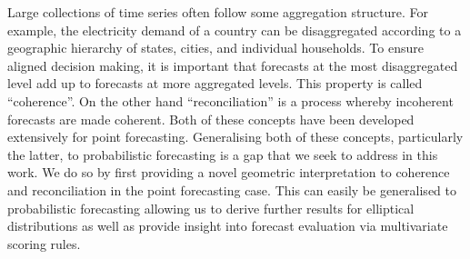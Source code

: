 \documentclass[12pt]{article}
\theoremstyle{definition}
\begin{document}

Large collections of time series often follow some aggregation structure. For example, the electricity demand of a country can be disaggregated according to a geographic hierarchy of states, cities, and individual households. To ensure aligned decision making, it is important that forecasts at the most disaggregated level add up to forecasts at more aggregated levels. This property is called ``coherence''.  On the other hand ``reconciliation'' is a process whereby incoherent forecasts are made coherent. Both of these concepts have been developed extensively for point forecasting. Generalising both of these concepts, particularly the latter, to probabilistic forecasting is a gap that we seek to address in this work.  We do so by first providing a novel geometric interpretation to coherence and reconciliation in the point forecasting case. This can easily be generalised to probabilistic forecasting allowing us to derive further results for elliptical distributions as well as provide insight into forecast evaluation via multivariate  scoring rules. 
\end{document}
